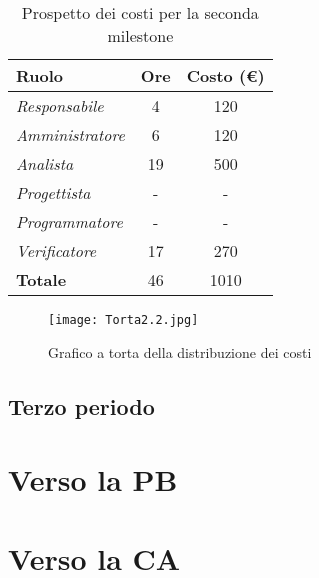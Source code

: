 \begin{table}[!ht]
    \centering
    \begin{tabular}{|l|c|c|}
    \hline
    \textbf{Ruolo} & \multicolumn{1}{l|}{\textbf{Ore}} & \multicolumn{1}{l|}{\textbf{Costo (€)}} \\ \hline
    \textit{Responsabile} & 4 & 120 \\ \hline
    \textit{Amministratore} & 6 & 120 \\ \hline
    \textit{Analista} & 19 & 500 \\ \hline
    \textit{Progettista} & - & - \\ \hline
    \textit{Programmatore} & - & - \\ \hline
    \textit{Verificatore} & 17 & 270 \\ \hline
    \textbf{Totale} & 46 & 1010 \\ \hline
    \end{tabular}
    \caption{Prospetto dei costi per la seconda milestone}
\end{table}

\begin{figure}[!ht]
    \texttt{[image: Torta2.2.jpg]}
    \caption{Grafico a torta della distribuzione dei costi} 
\end{figure}

\newpage
\subsection{Terzo periodo}

\section{Verso la PB}

\section{Verso la CA}